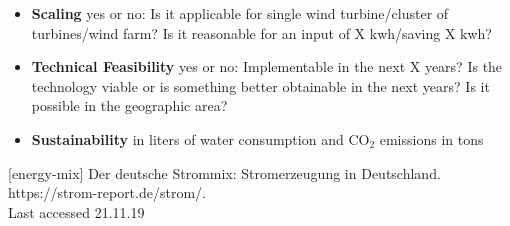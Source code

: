 \documentclass[12pt,a4paper]{article}
\begin{document}
\begin{parcolumns}[colwidths={1=2.5 cm, 2=10 cm, 3=2.5cm}]{3}
{\begin{itemize}
\item \textbf{Scaling} yes or no: Is it applicable for single wind turbine/cluster of turbines/wind farm? Is it reasonable for an input of X kwh/saving X kwh?
\item \textbf{Technical Feasibility} yes or no: Implementable in the next X years? Is the technology viable or is something better obtainable in the next years? Is it possible in the geographic area? 
\item \textbf{Sustainability} in liters of water consumption and CO$_{2}$ emissions in tons\\
\end{itemize}
[energy-mix]  Der deutsche Strommix: Stromerzeugung in Deutschland. \\https://strom-report.de/strom/.\\Last accessed 21.11.19


}


\end{parcolumns}
\end{document}
